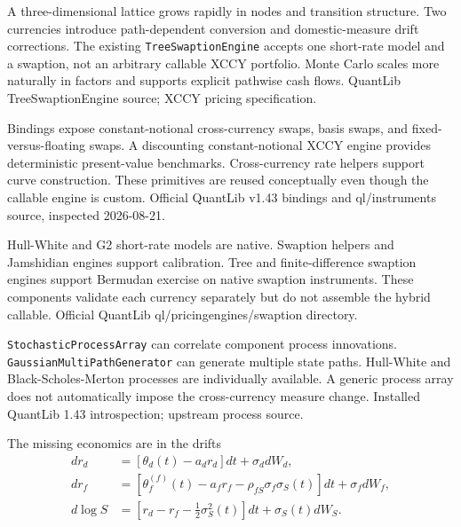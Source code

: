 {A three-dimensional lattice grows rapidly in nodes and transition structure.}
{Two currencies introduce path-dependent conversion and domestic-measure drift corrections.}
{The existing \texttt{TreeSwaptionEngine} accepts one short-rate model and a swaption, not an arbitrary callable XCCY portfolio.}
{Monte Carlo scales more naturally in factors and supports explicit pathwise cash flows.}
{QuantLib TreeSwaptionEngine source; XCCY pricing specification.}

{Bindings expose constant-notional cross-currency swaps, basis swaps, and fixed-versus-floating swaps.}
{A discounting constant-notional XCCY engine provides deterministic present-value benchmarks.}
{Cross-currency rate helpers support curve construction.}
{These primitives are reused conceptually even though the callable engine is custom.}
{Official QuantLib v1.43 bindings and ql/instruments source, inspected 2026-08-21.}

{Hull-White and G2 short-rate models are native.}
{Swaption helpers and Jamshidian engines support calibration.}
{Tree and finite-difference swaption engines support Bermudan exercise on native swaption instruments.}
{These components validate each currency separately but do not assemble the hybrid callable.}
{Official QuantLib ql/pricingengines/swaption directory.}

{\texttt{StochasticProcessArray} can correlate component process innovations.}
{\texttt{GaussianMultiPathGenerator} can generate multiple state paths.}
{Hull-White and Black-Scholes-Merton processes are individually available.}
{A generic process array does not automatically impose the cross-currency measure change.}
{Installed QuantLib 1.43 introspection; upstream process source.}

\begin{frame}{The missing economics are in the drifts}
  \[
  \begin{aligned}
  dr_d &= [\theta_d(t)-a_dr_d]dt+\sigma_d dW_d,\\
  dr_f &= [\theta_f^{(f)}(t)-a_fr_f-\rho_{fS}\sigma_f\sigma_S(t)]dt+\sigma_f dW_f,\\
  d\log S &= [r_d-r_f-\tfrac12\sigma_S^2(t)]dt+\sigma_S(t)dW_S.
  \end{aligned}
  \]
\end{frame}

